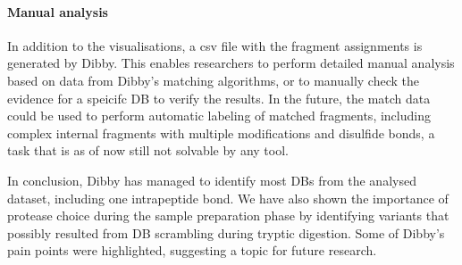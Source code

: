 \paragraph{Manual analysis} In addition to the visualisations, a csv file with the fragment assignments is generated by Dibby. This enables researchers to perform detailed manual analysis based on data from Dibby's matching algorithms, or to manually check the evidence for a speicifc DB to verify the results. In the future, the match data could be used to perform automatic labeling of matched fragments, including complex internal fragments with multiple modifications and disulfide bonds, a task that is as of now still not solvable by any tool.

In conclusion, Dibby has managed to identify most DBs from the analysed dataset, including one intrapeptide bond. We have also shown the importance of protease choice during the sample preparation phase by identifying variants that possibly resulted from DB scrambling during tryptic digestion. Some of Dibby's pain points were highlighted, suggesting a topic for future research.
